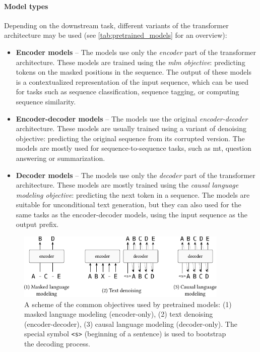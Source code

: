 {\paragraph{Model types} Depending on the downstream task, different variants of the transformer architecture may be used (see \autoref{tab:pretrained_models} for an overview):

\begin{itemize}
    \item \textbf{Encoder models} -- The models use only the \emph{encoder} part of the transformer architecture. These models are trained using the \emph{\ac{mlm} objective}: predicting tokens on the masked positions in the sequence. The output of these models is a contextualized representation of the input sequence, which can be used for tasks such as sequence classification, sequence tagging, or computing sequence similarity.
    \item \textbf{Encoder-decoder models} -- The models use the original \emph{encoder-decoder} architecture. These models are usually trained using a variant of denoising objective: predicting the original sequence from its corrupted version. The models are mostly used for sequence-to-sequence tasks, such as \ac{mt}, question answering or summarization.
    \item \textbf{Decoder models} -- The models use only the \emph{decoder} part of the transformer architecture. These models are mostly trained using the \emph{causal language modeling objective}: predicting the next token in a sequence. The models are suitable for unconditional text generation, but they can also used for the same tasks as the encoder-decoder models, using the input sequence as the output prefix.
\end{itemize}


\begin{figure}[t]
    \centering
    \includegraphics[width=0.9\textwidth]{img/objectives.pdf}

    \caption{A scheme of the common objectives used by pretrained models: (1) masked language modeling (encoder-only), (2) text denoising (encoder-decoder), (3)  causal language modeling (decoder-only). The special symbol \texttt{<s>} (beginning of a sentence) is used to bootstrap the decoding process.}\label{fig:objectives}


\end{figure}}
